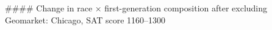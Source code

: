 #### Change in race × first-generation composition after excluding Geomarket: Chicago, SAT score 1160–1300
